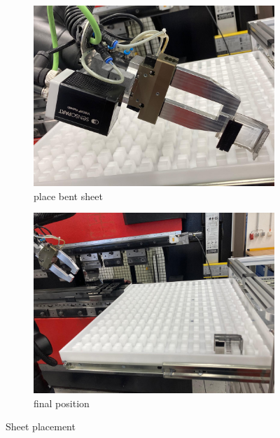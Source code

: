 \begin{figure}[h]
    \centering
    \begin{subfigure}[b]{0.48\textwidth}
        \centering
        \includegraphics[width=\textwidth]{figures/shelf-control/sheet-placement-01.png}
        \caption{place bent sheet}
        \label{subfig:sheet-placement1}
    \end{subfigure}\hspace{0.1cm}
    \begin{subfigure}[b]{0.48\textwidth}
        \centering
        \includegraphics[width=\textwidth]{figures/shelf-control/sheet-placement-02.png}
        \caption{final position}
        \label{subfig:sheet-placement2}
    \end{subfigure}\hspace{0.1cm}
    \caption{Sheet placement}
    \label{fig:sheet-placement}
\end{figure}


